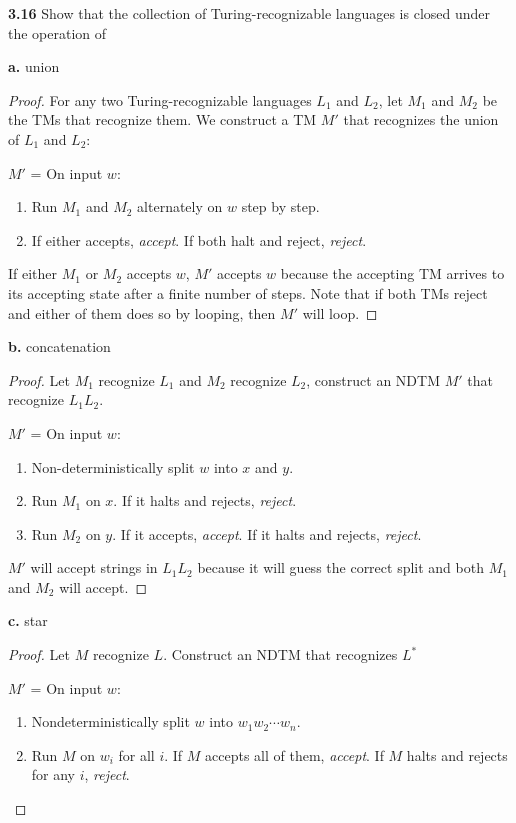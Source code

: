 \label{exe:TR_CLOSURE}
\textbf{3.16} Show that the collection of Turing-recognizable languages is closed under the operation of 

\textbf{a.} union
\begin{mdframed}
\begin{proof}
For any two Turing-recognizable languages $L_1$ and $L_2$, let $M_1$ and $M_2$ be the TMs that recognize them. We construct a TM $M'$ that recognizes the union of $L_1$ and $L_2$:

$M'$ = On input $w$:
\begin{enumerate}
\item Run $M_1$ and $M_2$ alternately on $w$ step by step.
\item If either accepts, \textit{accept}. If both halt and reject, \textit{reject}.
\end{enumerate}
If either $M_1$ or $M_2$ accepts $w$, $M'$ accepts $w$ because the accepting TM arrives to its accepting state after a finite number of steps. Note that if both TMs reject and either of them does so by looping, then $M'$ will loop.
\end{proof}
\end{mdframed}

\textbf{b.} concatenation

\begin{mdframed}
\begin{proof}
Let $M_1$ recognize $L_1$ and $M_2$ recognize $L_2$, construct an NDTM $M'$ that recognize $L_1L_2$.

$M'$ = On input $w$:
\begin{enumerate}
\item Non-deterministically split $w$ into $x$ and $y$.
\item Run $M_1$ on $x$. If it halts and rejects, \textit{reject}.
\item Run $M_2$ on $y$. If it accepts, \textit{accept}. If it halts and rejects, \textit{reject}.
\end{enumerate}

$M'$ will accept strings in $L_1L_2$ because it will guess the correct split and both $M_1$ and $M_2$ will accept.
\end{proof}
\end{mdframed}

\textbf{c.} star

\begin{mdframed}
\begin{proof}
Let $M$ recognize $L$. Construct an NDTM that recognizes $L^*$

$M'$ = On input $w$:
\begin{enumerate}
\item Nondeterministically split $w$ into $w_1 w_2 \cdots w_n$.
\item Run $M$ on $w_i$ for all $i$. If $M$ accepts all of them, \textit{accept}. If $M$ halts and rejects for any $i$, \textit{reject}.
\end{enumerate}
\end{proof}
\end{mdframed}

